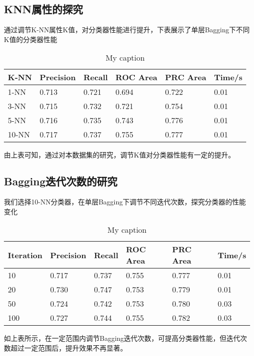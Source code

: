 \documentclass[a4paper,UTF8]{article}
\numberwithin{equation}{section}
\begin{document}
\subsection{KNN属性的探究}
通过调节K-NN属性K值，对分类器性能进行提升，下表展示了单层Bagging下不同K值的分类器性能

\begin{table}[H]
\centering
\caption{My caption}
\label{my-label}
\begin{tabular}{l|lllll}
\hline
K-NN  & Precision & Recall & ROC Area & PRC Area & Time/s \\ \hline
1-NN  & 0.713     & 0.721  & 0.694    & 0.722    & 0.01   \\ \hline
3-NN  & 0.715     & 0.732  & 0.721    & 0.754    & 0.01   \\ \hline
5-NN  & 0.716     & 0.735  & 0.743    & 0.776    & 0.01   \\ \hline
10-NN & 0.717     & 0.737  & 0.755    & 0.777    & 0.01   \\ \hline
\end{tabular}
\end{table}
由上表可知，通过对本数据集的研究，调节K值对分类器性能有一定的提升。


\subsection{Bagging迭代次数的研究}
我们选择10-NN分类器，在单层Bagging下调节不同迭代次数，探究分类器的性能变化

\begin{table}[H]
\centering
\caption{My caption}
\label{my-label}
\begin{tabular}{l|lllll}
\hline
Iteration & Precision & Recall & ROC Area & PRC Area & Time/s \\ \hline
10        & 0.717     & 0.737  & 0.755    & 0.777    & 0.01   \\ \hline
20        & 0.730     & 0.747  & 0.753    & 0.779    & 0.01   \\ \hline
50        & 0.724     & 0.742  & 0.753    & 0.780    & 0.03   \\ \hline
100       & 0.727     & 0.744  & 0.755    & 0.782    & 0.03   \\ \hline
\end{tabular}
\end{table}
如上表所示，在一定范围内调节Bagging迭代次数，可提高分类器性能，但迭代次数超过一定范围后，提升效果不再显著。
\end{document}
